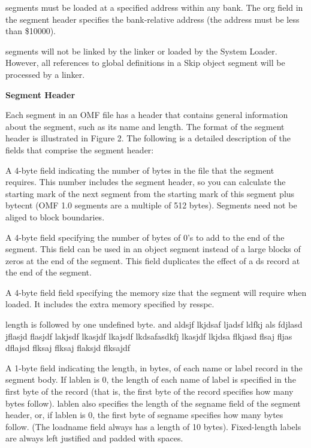  segments must be loaded at a specified
address within any bank. The {\omf org} field in the segment header
specifies the bank-relative address (the address must be less than \$10000).

 segments will not be linked by the linker or
loaded by the System Loader. However, all references to global definitions
in a Skip object segment will be processed by a linker.

{\bf Segment Header}

\description
Each segment in an OMF file has a header that contains general information
about the segment, such as its name and length. The format of the segment
header is illustrated in Figure 2. The following is a detailed description of
the fields that comprise the segment header:

 A 4-byte field indicating the number of bytes in the file
that the segment requires. This number includes the segment header, so you
can calculate the starting mark of the next segment from the starting mark
of this segment plus {\omf bytecnt} (OMF 1.0 segments are a multiple of
512 bytes). Segments need not be aliged to block boundaries.

 A 4-byte field specifying the number of bytes of 0's to add
to the end of the segment. This field can be used in an object segment
instead of a large blocks of zeros at the end of the segment. This field
duplicates the effect of a {\omf ds} record at the end of the segment.

 A 4-byte field field specifying the memory size that the
segment will require when loaded. It includes the extra memory specified
by {\omf resspc.}

\headhead
{\omf length} is followed by one undefined byte. and aldsjf lkjdsaf ljadsf
ldfkj als fdjlasd jflasjd flasjdf lakjsdf lkasjdf lkajsdf lkdsafasdkfj
lkasjdf lkjdsa flkjasd flsaj fljas dflajsd flksaj flksaj flaksjd flksajdf

 A 1-byte field indicating the length, in bytes, of each name
or label record in the segment body. If {\omf lablen} is 0, the length of
each name of label is specified in the first byte of the record (that is, the
first byte of the record specifies how many bytes follow). {\omf lablen}
also specifies the length of the {\omf segname} field of the segment header,
or, if {\omf lablen} is 0, the first byte of {\omf segname} specifies how
many bytes follow. (The {\omf loadname} field always has a length of 10
bytes). Fixed-length labels are always left justified and padded with spaces.


